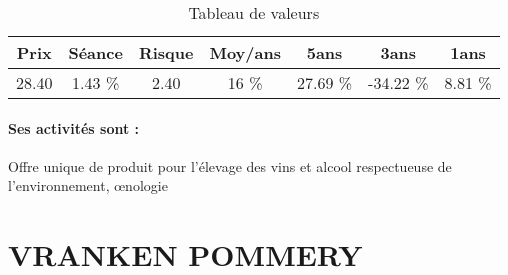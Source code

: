 \documentclass[11pt,a4paper]{report}%
\begin{document}
\begin{table}[H]
  \centering
    \begin{tabular}{|c|c|c|c|c|c|c|}
    \hline
    Prix & Séance & Risque  & Moy/ans & 5ans & 3ans & 1ans \\
    \hline
    28.40 &    1.43 \%    & 2.40 & 16 \% & 27.69 \% & -34.22 \% & 8.81 \% \\
    \hline
    \end{tabular}%
        \label{tab:table_TFF GROUP}%
      \caption{Tableau de valeurs}
\end{table}%

\paragraph{Ses activités sont : } Offre unique de produit pour l’élevage des vins et alcool respectueuse de l’environnement, œnologie 
    
    \newpage

\section{VRANKEN POMMERY}
\end{document}
